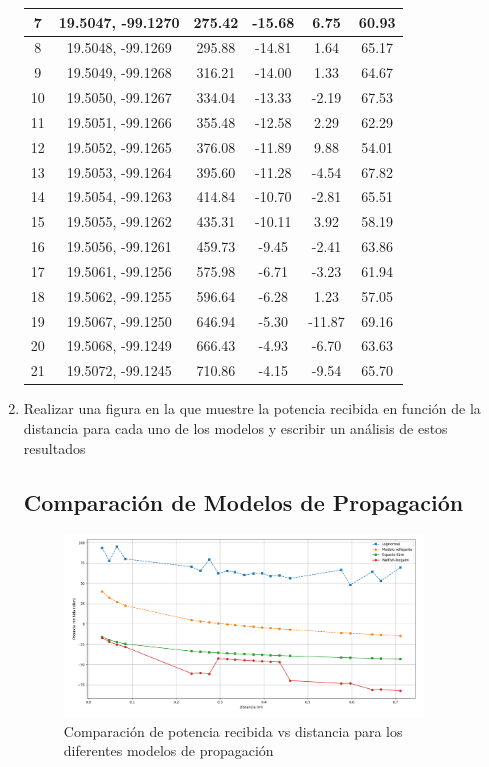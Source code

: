 \begin{enumerate}
\begin{table}[H]
{\begin{tabular}{|c|c|c|c|c|c|}
\hline
7 & 19.5047, -99.1270 & 275.42 & -15.68 & 6.75 & 60.93 \\
\hline
8 & 19.5048, -99.1269 & 295.88 & -14.81 & 1.64 & 65.17 \\
\hline
9 & 19.5049, -99.1268 & 316.21 & -14.00 & 1.33 & 64.67 \\
\hline
10 & 19.5050, -99.1267 & 334.04 & -13.33 & -2.19 & 67.53 \\
\hline
11 & 19.5051, -99.1266 & 355.48 & -12.58 & 2.29 & 62.29 \\
\hline
12 & 19.5052, -99.1265 & 376.08 & -11.89 & 9.88 & 54.01 \\
\hline
13 & 19.5053, -99.1264 & 395.60 & -11.28 & -4.54 & 67.82 \\
\hline
14 & 19.5054, -99.1263 & 414.84 & -10.70 & -2.81 & 65.51 \\
\hline
15 & 19.5055, -99.1262 & 435.31 & -10.11 & 3.92 & 58.19 \\
\hline
16 & 19.5056, -99.1261 & 459.73 & -9.45 & -2.41 & 63.86 \\
\hline
17 & 19.5061, -99.1256 & 575.98 & -6.71 & -3.23 & 61.94 \\
\hline
18 & 19.5062, -99.1255 & 596.64 & -6.28 & 1.23 & 57.05 \\
\hline
19 & 19.5067, -99.1250 & 646.94 & -5.30 & -11.87 & 69.16 \\
\hline
20 & 19.5068, -99.1249 & 666.43 & -4.93 & -6.70 & 63.63 \\
\hline
21 & 19.5072, -99.1245 & 710.86 & -4.15 & -9.54 & 65.70 \\
\hline
\end{tabular}%
}
\end{table}
\newpage
    \item Realizar una figura en la que muestre la potencia recibida en función de la distancia para cada uno de los modelos y escribir un análisis de estos resultados

\subsection{Comparación de Modelos de Propagación}

\begin{figure}[H]
    \centering
    \includegraphics[width=0.9\textwidth]{./img/grafica.png}
    \caption{Comparación de potencia recibida vs distancia para los diferentes modelos de propagación}
    \label{fig:comparacion_modelos}
\end{figure}


\end{enumerate}
